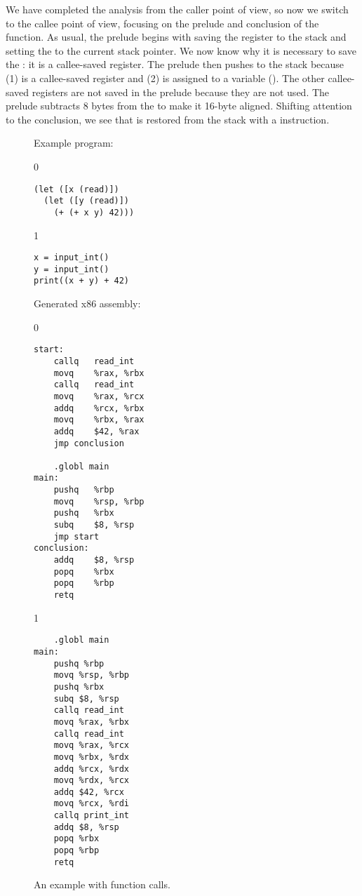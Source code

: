 \documentclass[7x10]{TimesAPriori_MIT}%
\def\racketEd{0}
\def\pythonEd{1}
\def\edition{1}
\newcommand{\pythonColor}[0]{}
\numberwithin{theorem}{chapter}
\numberwithin{definition}{chapter}
\numberwithin{equation}{chapter}
\begin{document}
We have completed the analysis from the caller point of view, so now
we switch to the callee point of view, focusing on the prelude and
conclusion of the  function. As usual, the prelude begins
with saving the  register to the stack and setting the
 to the current stack pointer. We now know why it is
necessary to save the : it is a callee-saved register.  The
prelude then pushes  to the stack because (1)  is
a callee-saved register and (2)  is assigned to a variable
(). The other callee-saved registers are not saved in the
prelude because they are not used. The prelude subtracts 8 bytes from
the  to make it 16-byte aligned. Shifting attention to the
conclusion, we see that  is restored from the stack with a
 instruction.

\begin{figure}[tp]
\begin{tcolorbox}[colback=white]
  
\begin{minipage}{0.45\textwidth}
Example \LangVar{} program:
{\if\edition\racketEd
\begin{lstlisting}
(let ([x (read)])
  (let ([y (read)])
    (+ (+ x y) 42)))
\end{lstlisting}
\fi}
{\if\edition\pythonEd\pythonColor
\begin{lstlisting}
x = input_int()
y = input_int()
print((x + y) + 42)
\end{lstlisting}
\fi}
\end{minipage}
\begin{minipage}{0.45\textwidth}
Generated x86 assembly:
{\if\edition\racketEd
\begin{lstlisting}
start:
	callq	read_int
	movq	%rax, %rbx
	callq	read_int
	movq	%rax, %rcx
	addq	%rcx, %rbx
	movq	%rbx, %rax
	addq	$42, %rax
	jmp conclusion

	.globl main
main:
	pushq	%rbp
	movq	%rsp, %rbp
	pushq	%rbx
	subq	$8, %rsp
	jmp start
conclusion:
	addq	$8, %rsp
	popq	%rbx
	popq	%rbp
	retq
\end{lstlisting}
\fi}
{\if\edition\pythonEd\pythonColor
\begin{lstlisting}
	.globl main
main:
	pushq %rbp
	movq %rsp, %rbp
	pushq %rbx
	subq $8, %rsp
	callq read_int
	movq %rax, %rbx
	callq read_int
	movq %rax, %rcx
	movq %rbx, %rdx
	addq %rcx, %rdx
	movq %rdx, %rcx
	addq $42, %rcx
	movq %rcx, %rdi
	callq print_int
	addq $8, %rsp
	popq %rbx
	popq %rbp
	retq
\end{lstlisting}
\fi}
\end{minipage}
\end{tcolorbox}

\caption{An example with function calls.}
  \label{fig:example-calling-conventions}
\end{figure}
\end{document}
